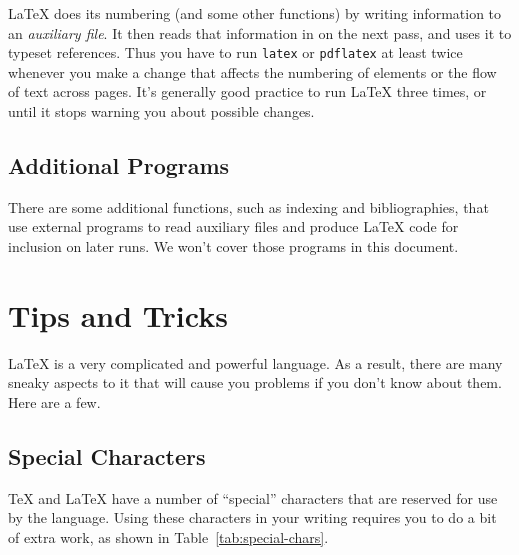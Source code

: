 \documentclass{icmmcm}
\newcommand{\key}[1]{\textsf{\emph{#1}}\xspace}
\newcommand{\prog}[1]{\texttt{#1}\xspace}
\newcommand{\tex}{\TeX\xspace}
\newcommand{\latex}{\LaTeX\xspace}
\begin{document}
{\latex does its numbering (and some other functions) by writing
information to an \key{auxiliary file}.  It then reads that
information in on the next pass, and uses it to typeset references.
Thus you have to run \prog{latex} or \prog{pdflatex} at least twice
whenever you make a change that affects the numbering of elements or
the flow of text across pages.  It's generally good practice to run
\latex three times, or until it stops warning you about possible
changes.

\subsection{Additional Programs}

There are some additional functions, such as indexing and
bibliographies, that use external programs to read auxiliary files and
produce \latex code for inclusion on later runs.  We won't cover those
programs in this document.


\section{Tips and Tricks}

\latex is a very complicated and powerful language.  As a result,
there are many sneaky aspects to it that will cause you problems if
you don't know about them.  Here are a few.

\subsection{Special Characters}%
\label{sec:special-chars}

\tex and \latex have a number of ``special'' characters that are
reserved for use by the language.  Using these characters in your
writing requires you to do a bit of extra work, as shown in
Table~\ref{tab:special-chars}.

}
\end{document}
